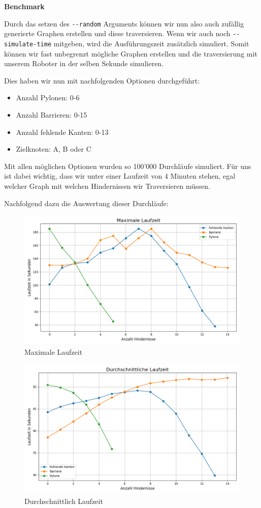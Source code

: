\textbf{Benchmark}

Durch das setzen des \verb|--random| Arguments können wir nun also auch zufällig generierte Graphen erstellen und diese traversieren.
Wenn wir auch noch \verb|--simulate-time| mitgeben, wird die Ausführungszeit zusätzlich simuliert.
Somit können wir fast unbegrenzt mögliche Graphen erstellen und die traversierung mit unserem Roboter in der selben Sekunde simulieren.

Dies haben wir nun mit nachfolgenden Optionen durchgeführt:

\begin{itemize}
  \item Anzahl Pylonen: 0-6
  \item Anzahl Barrieren: 0-15
  \item Anzahl fehlende Kanten: 0-13
  \item Zielknoten: A, B oder C
\end{itemize}

Mit allen möglichen Optionen wurden so 100'000 Durchläufe simuliert.
Für uns ist dabei wichtig, dass wir unter einer Laufzeit von 4 Minuten stehen, egal welcher Graph mit welchen Hindernissen wir Traversieren müssen.

Nachfolgend dazu die Auswertung dieser Durchläufe:

\begin{figure}[H]
  \centering\includegraphics[width=0.75\linewidth]{assets/informatik-prototyp/simulator/max_seconds.png}
  \caption{Maximale Laufzeit}
  \label{fig:simulation-run-max-seconds}
\end{figure}

\begin{figure}[H]
  \centering\includegraphics[width=0.75\linewidth]{assets/informatik-prototyp/simulator/mean_seconds.png}
  \caption{Durchschnittlich Laufzeit}
  \label{fig:simulation-run-mean-seconds}
\end{figure}


